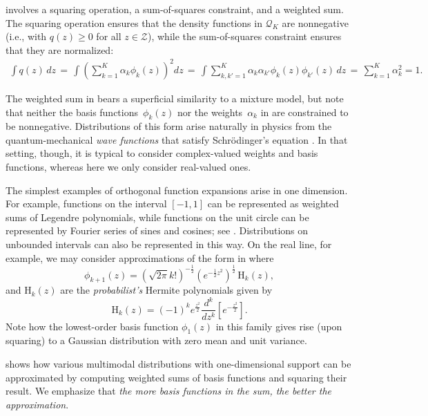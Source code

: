  involves a squaring operation, a sum-of-squares
constraint, and a weighted sum. The squaring operation ensures that
the density functions in $\mathcal{Q}_K$ are nonnegative (i.e., with
$q(z)\!\geq\!0$ for all $z\in\mathcal{Z}$), while the sum-of-squares constraint
ensures that they are normalized:
\begin{align}
  \int\! q(z)\, dz\, =\, \int\! \left(\sum_{k=1}^{K} \alpha_k \phi_k(z)\right)^2\!\! dz\, =\,
  \int\! \sum_{k,k'=1}^{K} \alpha_k \alpha_{k'} \phi_k(z)\phi_{k'}(z)\, dz\, =\, \sum_{k=1}^{K} \alpha_k^2 = 1.
\end{align}

The weighted sum in  bears a superficial similarity
to a mixture model, but note that neither the basis
functions~$\phi_k(z)$ nor the weights~$\alpha_k$ in 
are constrained to be nonnegative. Distributions of this form arise
naturally in physics from the quantum-mechanical \emph{wave functions}
that satisfy Schr\"odinger's equation \citep{griffiths2018introduction}.
In that setting, though, it is
typical to consider complex-valued weights and basis functions,
whereas here we only consider real-valued ones.


The simplest examples of orthogonal function expansions arise in one
dimension. For example, functions on the interval $[-1,1]$ can be
represented as weighted sums of Legendre polynomials, while functions
on the unit circle can be represented by Fourier series of sines and
cosines; see . Distributions on unbounded
intervals can also be represented in this way. On the real line, for
example, we may consider approximations of the form in
 where
\begin{equation}
\phi_{k+1}(z) = \left(\sqrt{2\pi}k!\right)^{-\frac{1}{2}}\left(e^{-\frac{1}{2}z^2}\right)^{\frac{1}{2}}\,\text{H}_{k}(z),
\label{eq:phi-hermite}
\end{equation}
and $\text{H}_k(z)$ are the \emph{probabilist's} Hermite polynomials given by
\begin{equation}
\text{H}_k(z) = (-1)^k e^{\frac{z^2}{2}} \frac{d^k}{dz^k}\left[e^{-\frac{z^2}{2}}\right].
\label{eq:hermite}
\end{equation}
Note how the lowest-order basis function $\phi_1(z)$ in this family gives rise
(upon squaring) to a Gaussian distribution with zero mean and unit variance.

 shows how various multimodal distributions with
one-dimensional support can be approximated by computing weighted sums
of basis functions and squaring their result. We emphasize that
\textit{the more basis functions in the sum, the better the
  approximation}.

